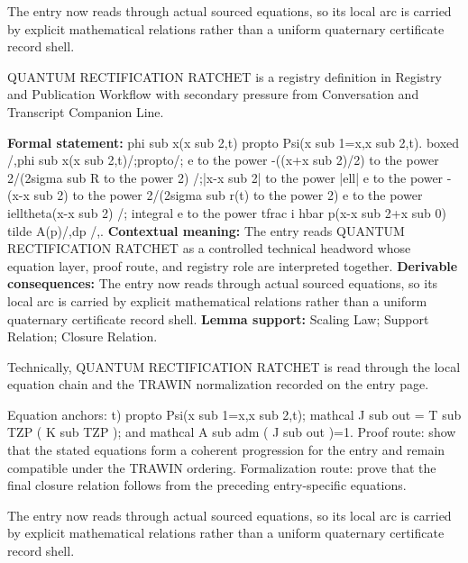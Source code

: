 The entry now reads through actual sourced equations, so its local arc is carried by explicit mathematical relations rather than a uniform quaternary certificate record shell.
\clearpage


\begingroup\small
{}
QUANTUM RECTIFICATION RATCHET is a registry definition in Registry and Publication Workflow with secondary pressure from Conversation and Transcript Companion Line.

\begingroup\footnotesize\setlength{\emergencystretch}{3em}\sloppy
\textbf{Formal statement:} phi sub x(x sub 2,t) propto Psi(x sub 1=x,x sub 2,t). boxed /,phi sub x(x sub 2,t)/;propto/; e to the power -((x+x sub 2)/2) to the power 2/(2sigma sub R to the power 2) /;|x-x sub 2| to the power |ell| e to the power -(x-x sub 2) to the power 2/(2sigma sub r(t) to the power 2) e to the power ielltheta(x-x sub 2) /; integral e to the power tfrac i hbar p(x-x sub 2+x sub 0) tilde A(p)/,dp /,. \textbf{Contextual meaning:} The entry reads QUANTUM RECTIFICATION RATCHET as a controlled technical headword whose equation layer, proof route, and registry role are interpreted together. \textbf{Derivable consequences:} The entry now reads through actual sourced equations, so its local arc is carried by explicit mathematical relations rather than a uniform quaternary certificate record shell. \textbf{Lemma support:} Scaling Law; Support Relation; Closure Relation.\par
\endgroup

Technically, QUANTUM RECTIFICATION RATCHET is read through the local equation chain and the TRAWIN normalization recorded on the entry page.

Equation anchors: t) propto Psi(x sub 1=x,x sub 2,t); mathcal J sub out = T sub TZP ( K sub TZP ); and mathcal A sub adm ( J sub out )=1. Proof route: show that the stated equations form a coherent progression for the entry and remain compatible under the TRAWIN ordering. Formalization route: prove that the final closure relation follows from the preceding entry-specific equations.

The entry now reads through actual sourced equations, so its local arc is carried by explicit mathematical relations rather than a uniform quaternary certificate record shell.
\endgroup

